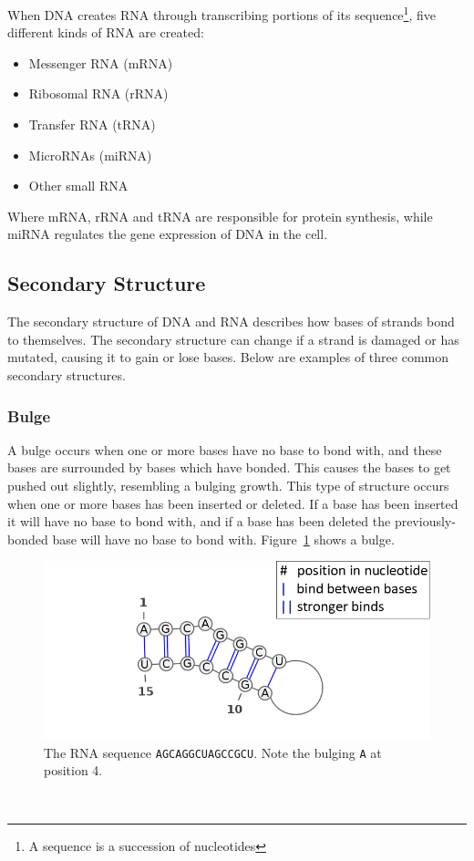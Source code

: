 When DNA creates RNA through transcribing portions of its sequence\footnote{A 
sequence is a succession of nucleotides}, five different kinds of RNA are 
created\cite[p. 236, table 7-1]{alberts}:
\begin{itemize}
\item Messenger RNA (mRNA)
\item Ribosomal RNA (rRNA)
\item Transfer RNA (tRNA)
\item MicroRNAs (miRNA)
\item Other small RNA
\end{itemize}
Where mRNA, rRNA and tRNA are responsible for protein synthesis, while miRNA 
regulates the gene expression of DNA in the cell.
\subsection{Secondary Structure}\label{structs}
The secondary structure of DNA and RNA describes how bases of 
strands bond to themselves. The secondary structure can change if 
a strand is damaged or has mutated, causing it to gain or lose 
bases. Below are examples of three common secondary structures.

\subsubsection{Bulge}
A bulge occurs when one or more bases have no base to bond with, and these 
bases are surrounded by bases which have bonded. This causes the bases to get 
pushed out slightly, resembling a bulging growth. This type of structure occurs 
when one or more bases has been inserted or deleted. If a base has been 
inserted it will have no base to bond with, and if a base has been deleted 
the previously-bonded base will have no base to bond with. Figure~\ref{fig:bulge} shows a bulge.

\begin{figure}[H]
\centering
\includegraphics[scale=0.4]{./lib/bulge.png}
\caption{The RNA sequence {\tt AGCAGGCUAGCCGCU}. Note the bulging {\tt A} at position 4.}
\label{fig:bulge}
\end{figure}~
\\
